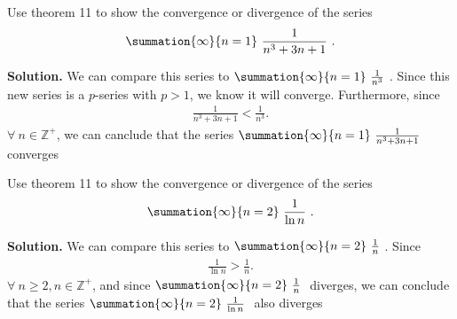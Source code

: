 \documentclass{report}
\begin{document}
    \pagebreak \bigbreak \noindent 
       \begin{eg}
        Use theorem 11 to show the convergence or divergence of the series
        \begin{align*}
            \summation{\infty}{n=1}\ \frac{1}{n^{3}+3n+1}\ 
        .\end{align*}
    \end{eg}
    \bigbreak \noindent 
    \textbf{Solution.} We can compare this series to  $\summation{\infty}{n=1}\ \frac{1}{n^{3}}\ $. Since this new series is a $p$-series with $p >1$,  we know it will converge. Furthermore, since 
    \begin{align*}
        \frac{1}{n^{3} + 3n + 1} < \frac{1}{n^{3}}
    .\end{align*}
    $\forall\ n \in \mathbb{Z^{+}}$, we can canclude that the series $\summation{\infty}{n=1}\ \frac{1}{n^{3}+3n+1}\ $ converges

    \bigbreak \noindent 
   \begin{eg}
        Use theorem 11 to show the convergence or divergence of the series
        \begin{align*}
            \summation{\infty}{n=2}\ \frac{1}{\ln{n}}\ 
        .\end{align*}
    \end{eg}
    \bigbreak \noindent 
    \textbf{Solution.} We can compare this series to $\summation{\infty}{n=2}\ \frac{1}{n}\ $. Since
    \begin{align*}
        \frac{1}{\ln{n}} > \frac{1}{n}
    .\end{align*}
    \bigbreak \noindent 
    $\forall\ n \geq 2, n \in \mathbb{Z^{+}}$, and since $\summation{\infty}{n=2}\ \frac{1}{n}\ $ diverges, we can conclude that the series $\summation{\infty}{n=2}\ \frac{1}{\ln{n}}\  $ also diverges

    \bigbreak \noindent 
\end{document}
